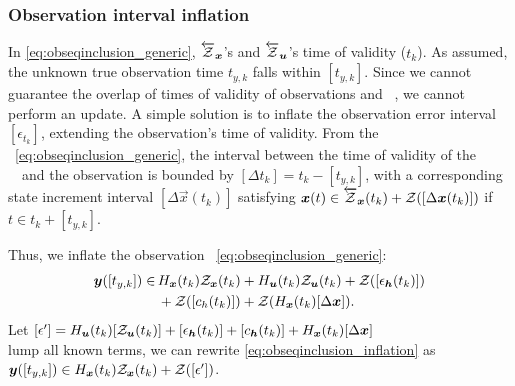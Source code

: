 \documentclass{ifacconf}
\begin{document}
\subsubsection{Observation interval inflation}
\label{sec:czesmf_update_inflation}
In \eqref{eq:obseqinclusion_generic}, $\overleftarrow{\mathcal{Z}}_{\boldsymbol{x}}$'s and $\overleftarrow{\mathcal{Z}}_{\boldsymbol{u}}$'s time of validity  ($t_{k}$).
As assumed, the unknown true observation time $t_{y,k}$ falls within $[t_{y,k}]$.
Since we cannot guarantee the overlap of times of validity of observations and \apriori\ \czs, we cannot perform an update.
A simple solution is to inflate the observation error interval $[\epsilon_{t_k}]$, extending the observation's time of validity.
From the \linearinclusion\ \eqref{eq:obseqinclusion_generic},
the interval between the time of validity of the \apriori\ \cz\ and the observation is bounded by
  $[\Delta t_k] = t_{k} - [t_{y,k}]$,
with a corresponding state increment interval
  $[\Delta \vec{x}(t_k)]$
satisfying
  $\boldsymbol{x}(t) \in \overleftarrow{\mathcal{Z}}_{\boldsymbol{x}} (t_k) + \mathcal{Z}([\Delta \boldsymbol{x}(t_k)])$
if $t \in t_{k} + [t_{y,k}]$.

Thus, we inflate the observation \linearinclusion\ \eqref{eq:obseqinclusion_generic}:
\begin{align}
  \boldsymbol{y}([t_{y,k}]) \in\, &
                                 H_{\boldsymbol{x}}(t_k)
                                 \mathcal{Z}_{\boldsymbol{x}}(t_k)
                                 + H_{\boldsymbol{u}}(t_k)
                                 \mathcal{Z}_{\boldsymbol{u}} (t_k)
                                 + \mathcal{Z}([\epsilon_{\boldsymbol{h}}(t_k)]) \nonumber\\
                               &
                                 + \mathcal{Z}([c_h(t_k)])
                                 + \mathcal{Z}(H_{\boldsymbol{x}}(t_k)
                                 [\Delta \boldsymbol{x}]).
                                 \label{eq:obseqinclusion_inflation}
\end{align}
Let 
  ${[\epsilon'] =
  H_{\boldsymbol{u}}(t_k)
  [\mathcal{Z}_{\boldsymbol{u}} (t_k)]
  + [\epsilon_{\boldsymbol{h}}(t_k)]
  + [c_{\boldsymbol{h}}(t_k)]
  + H_{\boldsymbol{x}}(t_k)
  [\Delta \boldsymbol{x}]}$ \\
lump all known terms, we can rewrite \eqref{eq:obseqinclusion_inflation} as
 \\${\boldsymbol{y} ([t_{y,k}]) \in H_{\boldsymbol{x}}(t_k)
                                   \mathcal{Z}_{\boldsymbol{x}}(t_k)
                                   + \mathcal{Z}([\epsilon'] )}$.
\end{document}
